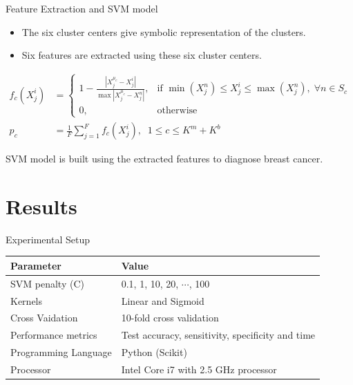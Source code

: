 \documentclass[xcolor=dvipsnames]{beamer}
\begin{document}
\begin{frame}{Feature Extraction and SVM model}
\begin{itemize}
\item The six cluster centers give symbolic representation of the clusters. 
\item Six features are extracted using these six cluster centers.
\end{itemize}
\begin{align*}
f_c(X^i_j) &= \begin{cases}
    1 - \frac{|X_j^{\mu_c}-X_j^i|}{\max|X_j^{\mu_c}-X_j^n|},& \text{if } \min(X_j^n) \leq X_j^i \leq \max(X_j^n),\; \forall n \in S_c\\
    0,              & \text{otherwise}
\end{cases}\\ 
p_c &= \frac{1}{F} \sum_{j=1}^Ff_c(X_j^i),\;\; 1\leq c \leq K^m + K^b
\end{align*}

\vspace{0.5cm}
\alert{SVM model is built using the extracted features to diagnose breast cancer.}
\end{frame}


\section{Results}

\begin{frame}{Experimental Setup}
\begin{table}[]
\centering
\begin{tabular}{|l|l|}
\hline
Parameter          & Value                                                                                      \\ \hline
SVM penalty  (C)   & 0.1, 1, 10, 20, $\cdots$, 100                                                               \\
Kernels            & Linear and Sigmoid                                                                         \\
Cross Vaidation	   & 10-fold cross validation\\	
Performance metrics & Test accuracy, sensitivity, specificity and time \\
Programming Language & Python (Scikit) \\
Processor          & Intel Core i7 with 2.5 GHz processor                                                      \\ \hline
\end{tabular}
\end{table}
\end{frame}
\end{document}
